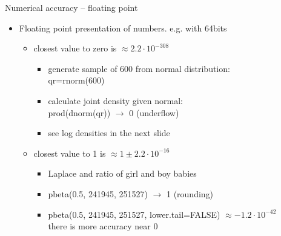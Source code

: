 \documentclass[english,t]{beamer}
\begin{document}
\begin{frame}{Numerical accuracy -- floating point}

  \begin{itemize}
  \item Floating point presentation of numbers. e.g. with 64bits
    \begin{itemize}
    \item closest value to zero is $\approx 2.2\cdot 10^{-308}$
      \begin{itemize}
      \item generate sample of 600 from normal distribution:\\
        {\color{navyblue} qr=rnorm(600)}
      \item calculate joint density given normal:\\
        {\color{navyblue} prod(dnorm(qr)) $\rightarrow$} {\color{red} 0 (underflow)}
      \item<2-> see log densities in the next slide
      \end{itemize}
    \item<3-> closest value to 1 is $\approx 1 \pm  2.2\cdot 10^{-16}$
      \begin{itemize}
      \item<3-> Laplace and ratio of girl and boy babies 
      \item<3-> {\color{navyblue}  pbeta(0.5, 241945, 251527) $\rightarrow$} {\color{red}  1 (rounding)}
      \item<4-> {\color{navyblue} pbeta(0.5, 241945, 251527, lower.tail=FALSE) $\approx -1.2\cdot 10^{-42}$}\\
        there is more accuracy near 0
      \end{itemize}
    \end{itemize}
  \end{itemize}

\end{frame}
\end{document}
